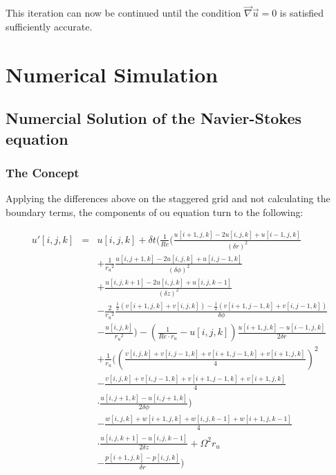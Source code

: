 \documentclass[12pt, a4paper, twoside]{article}
\begin{document}
		This iteration can now be continued until the condition $\vec{\nabla}\vec{u}=0$ is satisfied sufficiently accurate. 
		
	\newpage
\section{Numerical Simulation}
	\subsection{Numercial Solution of the Navier-Stokes equation}
		\subsubsection{The Concept}
			
			Applying the differences above on the staggered grid and not calculating the boundary terms, the components of ou equation turn to the following:
					
			\begin{eqnarray}
				u'[i,j,k] &=& u[i,j,k] + \delta t \Bigg( \frac{1}{Re}\Bigg(\frac{u[i+1,j,k]-2u[i,j,k]+u[i-1,j,k]}{(\delta r)^2}
				\nonumber \\
				&& + \frac{1}{{r_u}^2}\frac{u[i,j+1,k]-2u[i,j,k]+u[i,j-1,k]}{(\delta \phi)^2}
				\nonumber \\
				&& + \frac{u[i,j,k+1] - 2u[i,j,k] +u[i,j,k-1]}{(\delta z)^2}
				\nonumber \\
				&& - \frac{2}{{r_u}^2}\frac{\frac{1}{2}\left(v[i+1,j,k]+v[i,j,k]\right)-\frac{1}{2}\left(v[i+1,j-1,k]+v[i,j-1,k]\right)}{\delta \phi}
				\nonumber \\
				&&- \frac{u[i,j,k]}{{r_u}^2}\Bigg) - \left(\frac{1}{Re\cdot r_u} - u[i,j,k]\right)\frac{u[i+1,j,k]-u[i-1,j,k]}{2\delta r}
				\nonumber \\
				&& + \frac{1}{r_u}\Bigg(\left(\frac{v[i,j,k]+v[i,j-1,k]+v[i+1,j-1,k]+v[i+1,j,k]}{4}\right)^2
				\nonumber \\
				&& - \frac{v[i,j,k]+v[i,j-1,k]+v[i+1,j-1,k]+v[i+1,j,k]}{4}
				\nonumber \\
				&&\cdot \frac{u[i,j+1,k]-u[i,j+1,k]}{2\delta \phi}\Bigg)
				\nonumber \\
				&& - \frac{w[i,j,k]+w[i+1,j,k]+w[i,j,k-1]+w[i+1,j,k-1]}{4}
				\nonumber \\
				&&\cdot \frac{u[i,j,k+1]-u[i,j,k-1]}{2\delta z} + \Omega^2 r_u
				\nonumber \\
				&& - \frac{p[i+1,j,k]-p[i,j,k]}{\delta r} \Bigg)
			\end{eqnarray}
			
\end{document}
